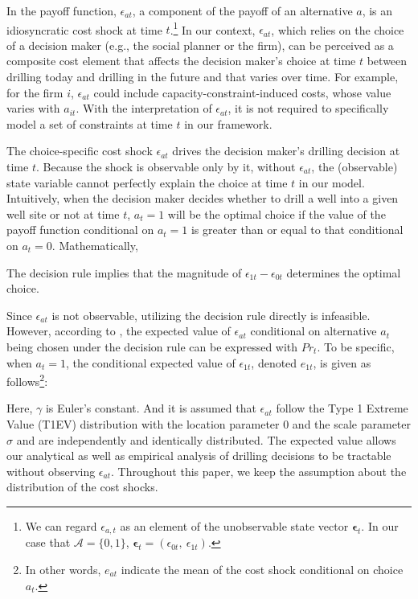 In the payoff function, $\epsilon_{at}$, a component of the payoff of an alternative $a$, is an idiosyncratic cost shock at time $t$.\footnote{We can regard $\epsilon_{a, t}$ as an element of the unobservable state vector $\boldsymbol{\epsilon}_{t}$. In our case that $\mathcal{A} = \{ 0, 1 \}$, $\boldsymbol{\epsilon}_{t} = ( \epsilon_{0t}, \ \epsilon_{1t} )$.} In our context, $\epsilon_{at}$, which relies on the choice of a decision maker (e.g., the social planner or the firm), can be perceived as a composite cost element that affects the decision maker's choice at time $t$ between drilling today and drilling in the future and that varies over time. For example, for the firm $i$, $\epsilon_{at}$ could include capacity-constraint-induced costs, whose value varies with $a_{it}$. With the interpretation of $\epsilon_{at}$, it is not required to specifically model a set of constraints at time $t$ in our framework. 

The choice-specific cost shock $\epsilon_{at}$ drives the decision maker's drilling decision at time $t$. Because the shock is observable only by it, without $\epsilon_{at}$, the (observable) state variable cannot perfectly explain the choice at time $t$ in our model. Intuitively, when the decision maker decides whether to drill a well into a given well site or not at time $t$, $a_{t} = 1$ will be the optimal choice if the value of the payoff function conditional on $a_{t} = 1$ is greater than or equal to that conditional on $a_{t} = 0$. Mathematically, 

The decision rule implies that the magnitude of $\epsilon_{1t} - \epsilon_{0t}$ determines the optimal choice. 

Since $\epsilon_{at}$ is not observable, utilizing the decision rule directly is infeasible. However, according to \cite{Euler-Equations-for-the-Estimation-of-Dynamic-Discrete-Choice-Structural-Models_Aguirregabiria-and-Magesan_2013}, the expected value of $\epsilon_{at}$ conditional on alternative $a_{t}$ being chosen under the decision rule can be expressed with $Pr_{t}$. To be specific, when $a_{t} = 1$, the conditional expected value of $\epsilon_{1t}$, denoted $e_{1t}$, is given as follows\footnote{In other words, $e_{at}$ indicate the mean of the cost shock conditional on choice $a_{t}$.}:

Here, $\gamma$ is Euler's constant. And it is assumed that $\epsilon_{at}$ follow the Type 1 Extreme Value (T1EV) distribution with the location parameter 0 and the scale parameter $\sigma$ and are independently and identically distributed. The expected value allows our analytical as well as empirical analysis of drilling decisions to be tractable without observing $\epsilon_{at}$. Throughout this paper, we keep the assumption about the distribution of the cost shocks. 

